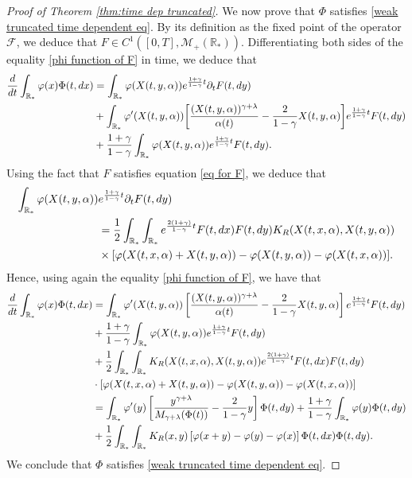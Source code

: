 \documentclass[11pt]{article}
\numberwithin{equation}{section}
\theoremstyle{plain}
\newcommand{\der}{\textup{d}}
\begin{document}
\begin{proof}[Proof of Theorem \ref{thm:time dep truncated}]
We now prove that $\Phi$ satisfies \eqref{weak truncated time dependent eq}. 
By its definition as the fixed point of the operator $\mathcal F$, we deduce that $F \in C^1([0, T] , \mathcal M_+(\mathbb R_*))$. 
Differentiating both sides of the equality \eqref{phi function of F} in time, we deduce that 
\begin{align*}
 \frac{\der}{\der t} \int_{\mathbb R_*} \varphi(x) \Phi(t, \der x)& =   \int_{\mathbb R_*}  \varphi(X(t, y, \alpha)) e^{\frac{1+\gamma}{1-\gamma} t } \partial_t F(t,\der y)  \\
&+\int_{\mathbb R_*}  \varphi'(X(t, y,\alpha)) \bigg[ \frac{(X(t,y,\alpha))^{\gamma+\lambda}}{\alpha(t)}  -\frac{2}{1-\gamma} X(t,y,\alpha) \bigg] e^{\frac{1+\gamma}{1-\gamma} t }F(t, \der y)  \\
&+ \frac{1+\gamma}{1-\gamma}\int_{\mathbb R_*}  \varphi(X(t, y, \alpha)) e^{\frac{1+\gamma}{1-\gamma} t } F(t,\der y).
\end{align*}
Using the fact that $F$ satisfies equation \eqref{eq for F}, we deduce that 
\begin{align*}
   \int_{\mathbb R_*}   \varphi(X(t, y, \alpha))& e^{\frac{1+\gamma}{1-\gamma} t } \partial_t F(t,\der y) \\
   &= \frac{1}{2}\int_{\mathbb R_*} \int_{\mathbb R_*}e^{ \frac{2(1+\gamma)}{1-\gamma}t} F(t,\der x) F(t,\der y)K_R(X(t,x,\alpha),X(t,y,\alpha))\\
&\times[ \varphi(X(t, x,\alpha)+X(t, y,\alpha ))- \varphi(X(t,y,\alpha ))- \varphi(X(t, x,\alpha))].
\end{align*}
Hence, using again the equality \eqref{phi function of F}, we have that
\begin{align*}
 \frac{\der}{\der t} \int_{\mathbb R_*} \varphi(x) \Phi(t,\der x)&= \int_{\mathbb R_*}  \varphi'(X(t, y,\alpha)) \left[   \frac{(X(t,y,\alpha))^{\gamma+\lambda}}{\alpha(t)}  -\frac{2}{1-\gamma} X(t,y,\alpha )\right] e^{\frac{1+\gamma}{1-\gamma} t } F(t,\der y)  \\
&+ \frac{1+\gamma}{1-\gamma} \int_{\mathbb R_*}  \varphi(X(t, y,\alpha)) e^{\frac{1+\gamma}{1-\gamma} t } F(t,\der y)  \\
&+  \frac{1}{2}\int_{\mathbb R_*} \int_{\mathbb R_*} K_R(X(t,x,\alpha),X(t,y,\alpha)) e^{ \frac{2(1+\gamma)}{1-\gamma}t}F(t,\der x) F(t,\der y) \\
&\cdot\left[ \varphi(X(t, x,\alpha)+X(t, y,\alpha))- \varphi(X(t,y,\alpha))- \varphi(X(t, x,\alpha)) \right]  \\  &= \int_{\mathbb R_*}  \varphi'(y) \left[\frac{y^{\gamma+\lambda}}{M_{\gamma+\lambda}(\Phi(t))}   -\frac{2}{1-\gamma} y\right] \Phi(t,\der y)+ \frac{1+\gamma}{1-\gamma} \int_{\mathbb R_*}  \varphi(y) \Phi(t,\der y)  \\
&+  \frac{1}{2}\int_{\mathbb R_*} \int_{\mathbb R_*} K_R(x ,y)\left[ \varphi( x+y)- \varphi(y)- \varphi(x) \right] 
\Phi(t,\der x)\Phi(t,\der y).
\end{align*} 
We conclude that $\Phi$ satisfies \eqref{weak truncated time dependent eq}. 
\end{proof} 
\end{document}
